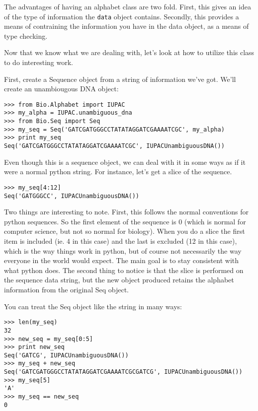 \documentclass[dvips]{article}
\begin{document}
The advantages of having an alphabet class are two fold. First, this gives an idea of the type of information the \verb|data| object contains. Secondly, this provides a means of contraining the information you have in the data object, as a means of type checking.


Now that we know what we are dealing with, let's look at how to utilize this class to do interesting work.


First, create a Sequence object from a string of information we've got. We'll create an unambiougous DNA object:

\begin{verbatim}
>>> from Bio.Alphabet import IUPAC
>>> my_alpha = IUPAC.unambiguous_dna
>>> from Bio.Seq import Seq
>>> my_seq = Seq('GATCGATGGGCCTATATAGGATCGAAAATCGC', my_alpha)
>>> print my_seq
Seq('GATCGATGGGCCTATATAGGATCGAAAATCGC', IUPACUnambiguousDNA())
\end{verbatim}


Even though this is a sequence object, we can deal with it in some ways as if it were a normal python string. For instance, let's get a slice of the sequence.

\begin{verbatim}
>>> my_seq[4:12]
Seq('GATGGGCC', IUPACUnambiguousDNA())
\end{verbatim}

Two things are interesting to note. First, this follows the normal conventions for python sequences.  So the first element of the sequence is 0 (which is normal for computer science, but not so normal for biology). When you do a slice the first item is included (ie. 4 in this case) and the last is excluded (12 in this case), which is the way things work in python, but of course not necessarily the way everyone in the world would expect. The main goal is to stay consistent with what python does. The second thing to notice is that the slice is performed on the sequence data string, but the new object produced retains the alphabet information from the original Seq object.


You can treat the Seq object like the string in many ways:

\begin{verbatim}
>>> len(my_seq)
32
>>> new_seq = my_seq[0:5]
>>> print new_seq
Seq('GATCG', IUPACUnambiguousDNA())
>>> my_seq + new_seq
Seq('GATCGATGGGCCTATATAGGATCGAAAATCGCGATCG', IUPACUnambiguousDNA())
>>> my_seq[5]
'A'
>>> my_seq == new_seq
0
\end{verbatim}
\end{document}
